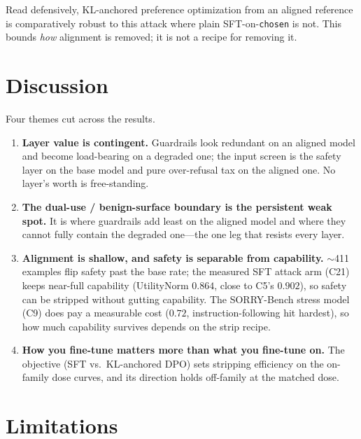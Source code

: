 \documentclass[11pt,a4paper]{article}
\newcommand{\code}[1]{\texttt{#1}}
\newcommand{\approxs}{$\sim$}
\begin{document}
Read defensively, KL-anchored preference optimization from an aligned reference is
comparatively robust to this attack where plain SFT-on-\code{chosen} is not. This bounds
\emph{how} alignment is removed; it is not a recipe for removing it.

\section{Discussion}

Four themes cut across the results.

\begin{enumerate}[leftmargin=1.4em,itemsep=3pt]
  \item \textbf{Layer value is contingent.} Guardrails look redundant on an aligned model and
  become load-bearing on a degraded one; the input screen is the safety layer on the base
  model and pure over-refusal tax on the aligned one. No layer's worth is free-standing.
  \item \textbf{The dual-use / benign-surface boundary is the persistent weak spot.} It is
  where guardrails add least on the aligned model and where they cannot fully contain the
  degraded one---the one leg that resists every layer.
  \item \textbf{Alignment is shallow, and safety is separable from capability.} \approxs{}411
  examples flip safety past the base rate; the measured SFT attack arm (C21) keeps near-full
  capability (UtilityNorm $0.864$, close to C5's $0.902$), so safety can be stripped without
  gutting capability. The SORRY-Bench stress model (C9) does pay a measurable cost ($0.72$,
  instruction-following hit hardest), so how much capability survives depends on the strip
  recipe.
  \item \textbf{How you fine-tune matters more than what you fine-tune on.} The objective (SFT
  vs.\ KL-anchored DPO) sets stripping efficiency on the on-family dose curves, and its
  direction holds off-family at the matched dose.
\end{enumerate}

\section{Limitations}
\end{document}
